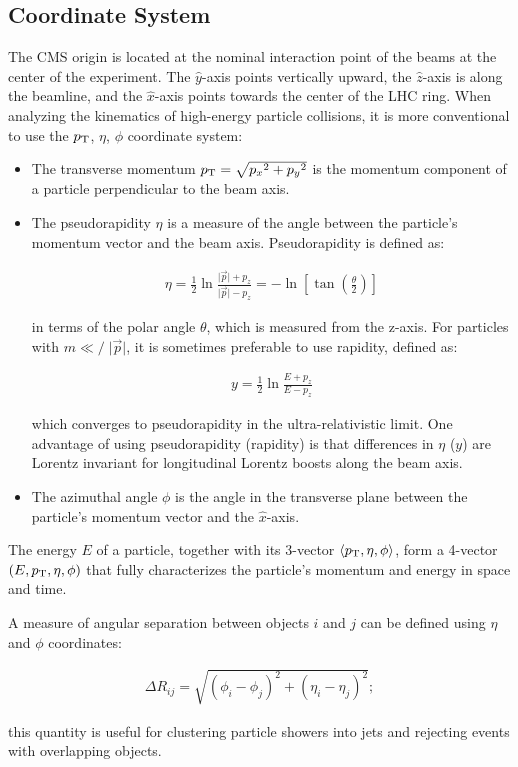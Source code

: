 \subsection{Coordinate System}
\label{CMS_Coordinate_System}
The CMS origin is located at the nominal interaction point of the beams at the center of the experiment.
The $\hat{y}$-axis points vertically upward, the $\hat{z}$-axis is along the beamline, and the $\hat{x}$-axis points towards the center of the LHC ring.
When analyzing the kinematics of high-energy particle collisions, it is more conventional to use the $p_{\mathrm{T}}$, $\eta$, $\phi$ coordinate system:
\begin{itemize}
\item The transverse momentum $p_{\mathrm{T}} = \sqrt {{p_x}^2+{p_y}^2}$ is the momentum component of a particle perpendicular to the beam axis. 
\item The pseudorapidity $\eta$ is a measure of the angle between the particle's momentum vector and the beam axis.
Pseudorapidity is defined as: 
\begin{linenomath*}
\begin{align}
\eta=\frac{1}{2} \ln \frac{\vert\vec{p}\vert+p_z}{\vert\vec{p}\vert-p_z}=-\ln \left[\tan \left(\frac{\theta}{2}\right)\right]
\end{align}
\end{linenomath*}
in terms of the polar angle $\theta$, which is measured from the z-axis.
For particles with $m {{\ll}\!\!\!\!/} \; \vert \vec{p} \vert$, it is sometimes preferable to use rapidity, defined as:
\begin{linenomath*}
\begin{align}
y=\frac{1}{2} \ln \frac{E+p_z}{E-p_z}
\label{Rapidity}
\end{align}
\end{linenomath*}
which converges to pseudorapidity in the ultra-relativistic limit.
One advantage of using pseudorapidity (rapidity) is that differences in $\eta$ ($y$) are Lorentz invariant for longitudinal Lorentz boosts along the beam axis.
\item The azimuthal angle $\phi$ is the angle in the transverse plane between the particle's momentum vector and the $\hat{x}$-axis.
\end{itemize}
The energy $E$ of a particle, together with its 3-vector $\langle p_{\mathrm{T}}, \eta, \phi \rangle$, form a 4-vector $(E,p_{\mathrm{T}}, \eta, \phi)$ that fully characterizes the particle's momentum and energy in space and time.

A measure of angular separation between objects $i$ and $j$ can be defined using $\eta$ and $\phi$ coordinates:
\begin{linenomath*}
\begin{align}
\Delta R_{ij} = \sqrt {{(\phi_i - \phi_j)}^2+{(\eta_i - \eta_j)}^2};
\label{DeltaR}
\end{align}
\end{linenomath*}
this quantity is useful for clustering particle showers into jets and rejecting events with overlapping objects.

